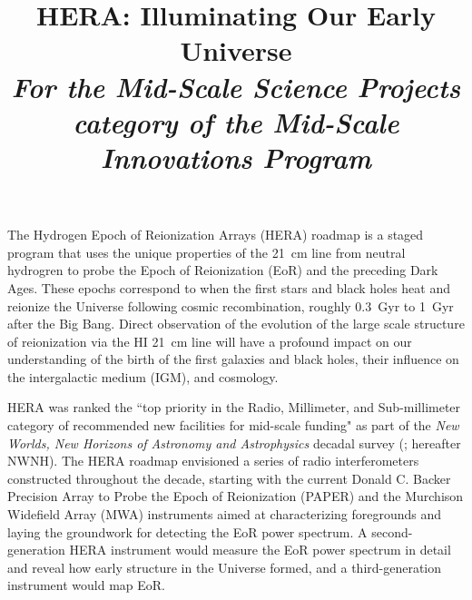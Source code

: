 \documentclass[preprint]{aastex}
\def\HI{{H{\small I }}}
\begin{document}
\title{HERA: Illuminating Our Early Universe\\
{\it For the Mid-Scale Science Projects category of the Mid-Scale Innovations Program}} 



{ \setlength{\parindent}{0cm}
The Hydrogen Epoch of Reionization Arrays (HERA) roadmap is a staged 
program that uses the unique properties of the 21~cm line from neutral 
hydrogren to probe the 
Epoch of Reionization (EoR) and the preceding Dark Ages.  These epochs
correspond to
when the first stars and black holes heat and reionize the
Universe following cosmic recombination, roughly
0.3~Gyr to 1~Gyr after the Big Bang. Direct observation of the evolution of the
large scale structure of reionization via the \HI 21~cm line will have a profound impact on our
understanding of the birth of the first galaxies and black holes, their
influence on the intergalactic medium (IGM), and cosmology.}  

HERA was ranked the ``top priority in the Radio, Millimeter, and Sub-millimeter
category of recommended new facilities for mid-scale funding" as part of the
{\it New Worlds, New Horizons of Astronomy and Astrophysics} decadal survey
(\citealt{astro2010}; hereafter NWNH).  
The HERA roadmap envisioned a series of
radio interferometers constructed throughout the decade, starting with the current
Donald C. Backer Precision Array to Probe the Epoch of Reionization (PAPER) and 
the Murchison Widefield Array (MWA) instruments 
aimed at characterizing
foregrounds and laying the groundwork for detecting the EoR power
spectrum. A second-generation HERA instrument would measure the EoR power spectrum in
detail and reveal how early structure in the Universe formed, and a
third-generation instrument would map EoR.
\end{document}
